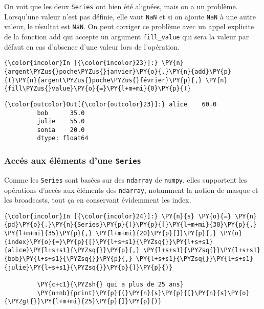     On voit que les deux \texttt{Series} ont bien été alignées, mais on a un
problème. Lorsqu'une valeur n'est pas définie, elle vaut \texttt{NaN} et
si on ajoute \texttt{NaN} à une autre valeur, le résultat est
\texttt{NaN}. On peut corriger ce problème avec un appel explicite de la
fonction add qui accepte un argument \texttt{fill\_value} qui sera la
valeur par défaut en cas d'absence d'une valeur lors de l'opération.

    \begin{Verbatim}[commandchars=\\\{\},frame=single,framerule=0.3mm,rulecolor=\color{cellframecolor}]
{\color{incolor}In [{\color{incolor}23}]:} \PY{n}{argent\PYZus{}poche\PYZus{}janvier}\PY{o}{.}\PY{n}{add}\PY{p}{(}\PY{n}{argent\PYZus{}poche\PYZus{}février}\PY{p}{,} \PY{n}{fill\PYZus{}value}\PY{o}{=}\PY{l+m+mi}{0}\PY{p}{)}
\end{Verbatim}


\begin{Verbatim}[commandchars=\\\{\},frame=single,framerule=0.3mm,rulecolor=\color{cellframecolor}]
{\color{outcolor}Out[{\color{outcolor}23}]:} alice    60.0
         bob      35.0
         julie    55.0
         sonia    20.0
         dtype: float64
\end{Verbatim}
            
    \hypertarget{accuxe9s-aux-uxe9luxe9ments-dune-series}{%
\subsubsection{\texorpdfstring{Accés aux éléments d'une
\texttt{Series}}{Accés aux éléments d'une Series}}\label{accuxe9s-aux-uxe9luxe9ments-dune-series}}

    Comme les \texttt{Series} sont basées sur des \texttt{ndarray} de
\texttt{numpy}, elles supportent les opérations d'accès aux éléments des
\texttt{ndarray}, notamment la notion de masque et les broadcasts, tout
ça en conservant évidemment les index.

    \begin{Verbatim}[commandchars=\\\{\},frame=single,framerule=0.3mm,rulecolor=\color{cellframecolor}]
{\color{incolor}In [{\color{incolor}24}]:} \PY{n}{s} \PY{o}{=} \PY{n}{pd}\PY{o}{.}\PY{n}{Series}\PY{p}{(}\PY{p}{[}\PY{l+m+mi}{30}\PY{p}{,} \PY{l+m+mi}{35}\PY{p}{,} \PY{l+m+mi}{20}\PY{p}{]}\PY{p}{,} \PY{n}{index}\PY{o}{=}\PY{p}{[}\PY{l+s+s1}{\PYZsq{}}\PY{l+s+s1}{alice}\PY{l+s+s1}{\PYZsq{}}\PY{p}{,} \PY{l+s+s1}{\PYZsq{}}\PY{l+s+s1}{bob}\PY{l+s+s1}{\PYZsq{}}\PY{p}{,} \PY{l+s+s1}{\PYZsq{}}\PY{l+s+s1}{julie}\PY{l+s+s1}{\PYZsq{}}\PY{p}{]}\PY{p}{)}
         
         \PY{c+c1}{\PYZsh{} qui a plus de 25 ans}
         \PY{n+nb}{print}\PY{p}{(}\PY{n}{s}\PY{p}{[}\PY{n}{s}\PY{o}{\PYZgt{}}\PY{l+m+mi}{25}\PY{p}{]}\PY{p}{)}
\end{Verbatim}


